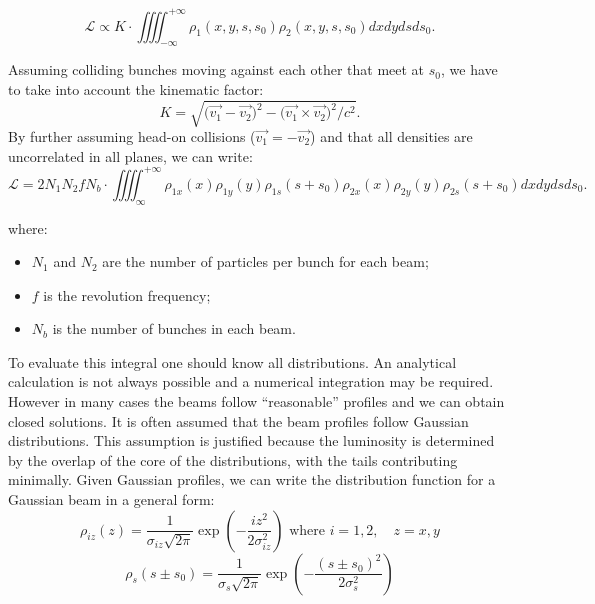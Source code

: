 \begin{equation}
    \mathcal{L} \propto K\cdot\iiiint_{-\infty}^{+\infty}\rho_1(x,y,s,s_0)\rho_2(x,y,s,s_0)dxdydsds_0.\label{lumi_propto}
\end{equation}

Assuming colliding bunches moving against each other that meet at $s_0$, we have to take into account the kinematic factor\cite{Moller}:
\begin{equation}
    K = \sqrt{\bigl(\vec{v_1}-\vec{v_2}\bigr)^2-\bigl(\vec{v_1} \times \vec{v_2}\bigr)^2/c^2}.
\end{equation}
By further assuming head-on collisions ($\vec{v_1}=-\vec{v_2}$) and that all densities are uncorrelated in all planes, we can write:
\begin{equation}
        \mathcal{L} = 2 N_1 N_2 f N_b\cdot\iiiint_{\infty}^{+\infty}\rho_{1x}(x)\rho_{1y}(y)\rho_{1s}(s+s_0)\rho_{2x}(x)\rho_{2y}(y)\rho_{2s}(s+s_0)dxdydsds_0.\label{beam_overlap}
\end{equation}

where:
\begin{itemize}
    \item \( N_1 \) and \( N_2 \) are the number of particles per bunch for each beam;
    \item \( f \) is the revolution frequency;
    \item \( N_b \) is the number of bunches in each beam.
\end{itemize}

To evaluate this integral one should know all distributions. An analytical calculation is not always possible and a numerical integration may be required. However in many cases the beams follow ``reasonable” profiles and we can obtain closed solutions. It is often assumed that the beam profiles follow Gaussian distributions. This assumption is justified because the luminosity is determined by the overlap of the core of the distributions, with the tails contributing minimally.
Given Gaussian profiles, we can write the distribution function for a Gaussian beam in a general form:
\begin{equation}
\rho_{iz}(z) =\frac{1}{\sigma_{iz}\sqrt{2\pi}} \exp\left( -\frac{iz^2}{2 \sigma_{iz}^2} \right) \text{ where } i=1,2, \quad z=x,y
\end{equation}
\begin{equation}
\rho_{s}(s\pm s_0) =\frac{1}{\sigma_s\sqrt{2\pi}} \exp\left( -\frac{(s\pm s_0)^2}{2 \sigma_s^2} \right)
\end{equation}

